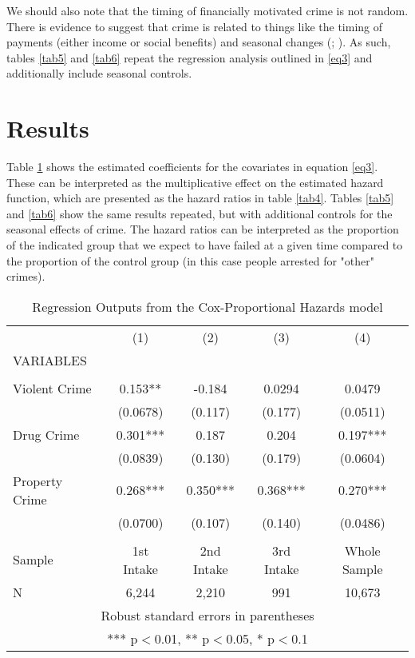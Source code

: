 \documentclass{article}
\begin{document}
We should also note that the timing of financially motivated crime is not random. There is evidence to suggest that crime is related to things like the timing of payments (either income or social benefits) and seasonal changes (\cite{carr}; \cite{hipp}). As such, tables \ref{tab5} and \ref{tab6} repeat the regression analysis outlined in \ref{eq3} and additionally include seasonal controls. 

\section{Results}
Table \ref{tab3} shows the estimated coefficients for the covariates in equation \ref{eq3}. These can be interpreted as the multiplicative effect on the estimated hazard function, which are presented as the hazard ratios in table \ref{tab4}. Tables \ref{tab5} and \ref{tab6} show the same results repeated, but with additional controls for the seasonal effects of crime. The hazard ratios can be interpreted as the proportion of the indicated group that we expect to have failed at a given time compared to the proportion of the control group (in this case people arrested for "other" crimes).

\begin{table}[t]
    \centering
    \caption{Regression Outputs from the Cox-Proportional Hazards model }
\begin{tabular}{lcccc} \hline
 & (1) & (2) & (3) & (4) \\
VARIABLES &  & &  &  \\ \hline
 &  &  &  &  \\
Violent Crime & 0.153** & -0.184 & 0.0294 & 0.0479 \\
 & (0.0678) & (0.117) & (0.177) & (0.0511) \\
Drug Crime & 0.301*** & 0.187 & 0.204 & 0.197*** \\
 & (0.0839) & (0.130) & (0.179) & (0.0604) \\
Property Crime & 0.268*** & 0.350*** & 0.368*** & 0.270*** \\
 & (0.0700) & (0.107) & (0.140) & (0.0486) \\
 &  &  &  &  \\
 Sample & 1st Intake & 2nd Intake & 3rd Intake & Whole Sample \\
 N & 6,244 & 2,210 & 991 & 10,673 \\ \hline
\multicolumn{5}{c}{ Robust standard errors in parentheses} \\
\multicolumn{5}{c}{ *** p$<$0.01, ** p$<$0.05, * p$<$0.1} \\
\end{tabular}
    \label{tab3}
\end{table}
\end{document}
